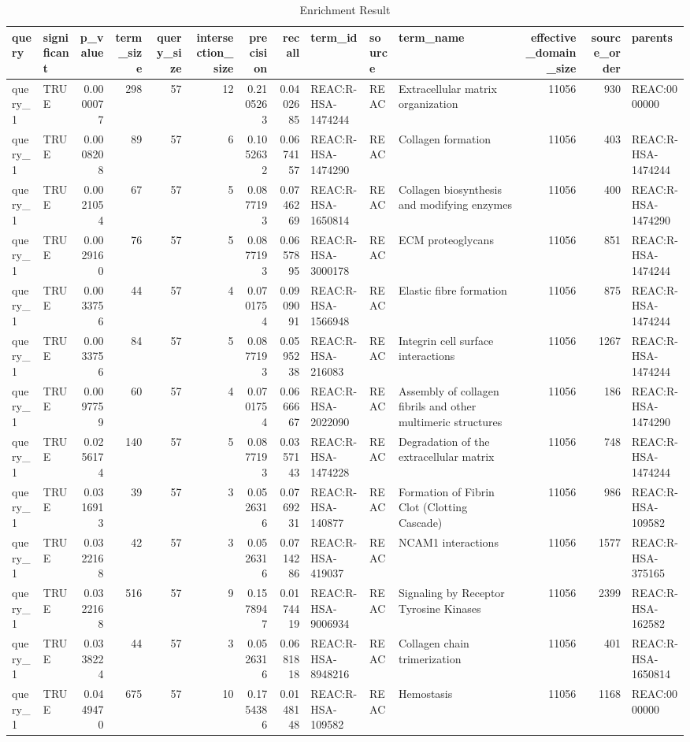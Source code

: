 \documentclass[
]{book}
\begin{document}
\begin{table}
\centering
\caption{\label{tab:unnamed-chunk-20}Enrichment Result}
\centering
\fontsize{10}{12}\selectfont
\begin{tabular}[t]{l|l|r|r|r|r|r|r|l|l|l|r|r|l}
\hline
query & significant & p\_value & term\_size & query\_size & intersection\_size & precision & recall & term\_id & source & term\_name & effective\_domain\_size & source\_order & parents\\
\hline
query\_1 & TRUE & 0.0000077 & 298 & 57 & 12 & 0.2105263 & 0.0402685 & REAC:R-HSA-1474244 & REAC & Extracellular matrix organization & 11056 & 930 & REAC:0000000\\
\hline
query\_1 & TRUE & 0.0008208 & 89 & 57 & 6 & 0.1052632 & 0.0674157 & REAC:R-HSA-1474290 & REAC & Collagen formation & 11056 & 403 & REAC:R-HSA-1474244\\
\hline
query\_1 & TRUE & 0.0021054 & 67 & 57 & 5 & 0.0877193 & 0.0746269 & REAC:R-HSA-1650814 & REAC & Collagen biosynthesis and modifying enzymes & 11056 & 400 & REAC:R-HSA-1474290\\
\hline
query\_1 & TRUE & 0.0029160 & 76 & 57 & 5 & 0.0877193 & 0.0657895 & REAC:R-HSA-3000178 & REAC & ECM proteoglycans & 11056 & 851 & REAC:R-HSA-1474244\\
\hline
query\_1 & TRUE & 0.0033756 & 44 & 57 & 4 & 0.0701754 & 0.0909091 & REAC:R-HSA-1566948 & REAC & Elastic fibre formation & 11056 & 875 & REAC:R-HSA-1474244\\
\hline
query\_1 & TRUE & 0.0033756 & 84 & 57 & 5 & 0.0877193 & 0.0595238 & REAC:R-HSA-216083 & REAC & Integrin cell surface interactions & 11056 & 1267 & REAC:R-HSA-1474244\\
\hline
query\_1 & TRUE & 0.0097759 & 60 & 57 & 4 & 0.0701754 & 0.0666667 & REAC:R-HSA-2022090 & REAC & Assembly of collagen fibrils and other multimeric structures & 11056 & 186 & REAC:R-HSA-1474290\\
\hline
query\_1 & TRUE & 0.0256174 & 140 & 57 & 5 & 0.0877193 & 0.0357143 & REAC:R-HSA-1474228 & REAC & Degradation of the extracellular matrix & 11056 & 748 & REAC:R-HSA-1474244\\
\hline
query\_1 & TRUE & 0.0316913 & 39 & 57 & 3 & 0.0526316 & 0.0769231 & REAC:R-HSA-140877 & REAC & Formation of Fibrin Clot (Clotting Cascade) & 11056 & 986 & REAC:R-HSA-109582\\
\hline
query\_1 & TRUE & 0.0322168 & 42 & 57 & 3 & 0.0526316 & 0.0714286 & REAC:R-HSA-419037 & REAC & NCAM1 interactions & 11056 & 1577 & REAC:R-HSA-375165\\
\hline
query\_1 & TRUE & 0.0322168 & 516 & 57 & 9 & 0.1578947 & 0.0174419 & REAC:R-HSA-9006934 & REAC & Signaling by Receptor Tyrosine Kinases & 11056 & 2399 & REAC:R-HSA-162582\\
\hline
query\_1 & TRUE & 0.0338224 & 44 & 57 & 3 & 0.0526316 & 0.0681818 & REAC:R-HSA-8948216 & REAC & Collagen chain trimerization & 11056 & 401 & REAC:R-HSA-1650814\\
\hline
query\_1 & TRUE & 0.0449470 & 675 & 57 & 10 & 0.1754386 & 0.0148148 & REAC:R-HSA-109582 & REAC & Hemostasis & 11056 & 1168 & REAC:0000000\\
\hline
\end{tabular}
\end{table}
\end{document}
